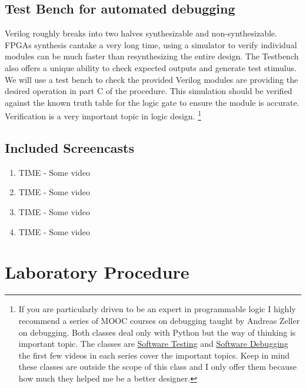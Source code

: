 \documentclass[12pt,journal]{IEEEtran}
\begin{document}
      \subsection{Test Bench for automated debugging}
      Verilog roughly breaks into two halves synthesizable and non-synthesizable. FPGAs synthesis cantake a very long time, using a simulator to verify individual modules can be much faster than resynthesizing the entire design. The Testbench also offers a unique ability to check expected outputs and generate test stimulus. We will use a test bench to check the provided Verilog modules are providing the desired operation in part C of the procedure. This simulation should be verified against the known truth table for the logic gate to ensure the module is accurate. Verification is a very important topic in logic design. \footnote{If you are particularly driven to be an expert in programmable logic I highly recommend a series of MOOC courses on debugging taught by Andreas Zeller on debugging. Both classes deal only with Python but the way of thinking is important topic. The classes are \href{https://www.udacity.com/course/cs258}{Software Testing} and \href{https://www.udacity.com/course/cs259}{Software Debugging} the first few videos in each series cover the important topics. Keep in mind these classes are outside the scope of this class and I only offer them because how much they helped me be a better designer.}

    \subsection{Included Screencasts}
      \begin{enumerate}
        \item TIME - Some video
        \item TIME - Some video
        \item TIME - Some video
        \item TIME - Some video
      \end{enumerate}

  \section{Laboratory Procedure}
\end{document}
